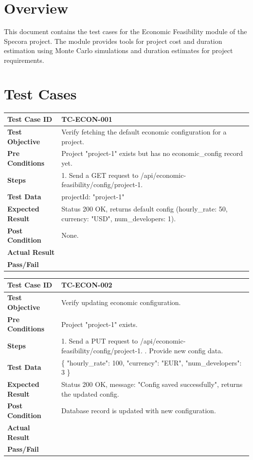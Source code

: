 \section{Overview}
This document contains the test cases for the Economic Feasibility module of the Specora project. The module provides tools for project cost and duration estimation using Monte Carlo simulations and duration estimates for project requirements.

\section{Test Cases}

\begin{longtable}{|p{}|p{}|}
\hline
\textbf{Test Case ID} & TC-ECON-001 \\ \hline
\textbf{Test Objective} & Verify fetching the default economic configuration for a project. \\ \hline
\textbf{Pre Conditions} & Project "project-1" exists but has no economic\_config record yet. \\ \hline
\textbf{Steps} & 
1. Send a GET request to /api/economic-feasibility/config/project-1. \\ \hline
\textbf{Test Data} & projectId: "project-1" \\ \hline
\textbf{Expected Result} & Status 200 OK, returns default config (hourly\_rate: 50, currency: "USD", num\_developers: 1). \\ \hline
\textbf{Post Condition} & None. \\ \hline
\textbf{Actual Result} &  \\ \hline
\textbf{Pass/Fail} &  \\ \hline
\end{longtable}

\begin{longtable}{|p{}|p{}|}
\hline
\textbf{Test Case ID} & TC-ECON-002 \\ \hline
\textbf{Test Objective} & Verify updating economic configuration. \\ \hline
\textbf{Pre Conditions} & Project "project-1" exists. \\ \hline
\textbf{Steps} & 
1. Send a PUT request to /api/economic-feasibility/config/project-1. \newline
2. Provide new config data. \\ \hline
\textbf{Test Data} & \{ "hourly\_rate": 100, "currency": "EUR", "num\_developers": 3 \} \\ \hline
\textbf{Expected Result} & Status 200 OK, message: "Config saved successfully", returns the updated config. \\ \hline
\textbf{Post Condition} & Database record is updated with new configuration. \\ \hline
\textbf{Actual Result} &  \\ \hline
\textbf{Pass/Fail} &  \\ \hline
\end{longtable}

